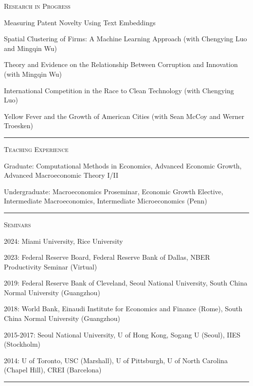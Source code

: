 \documentclass{article}
\begin{document}
\parbox{\textwidth}{
\parbox[t]{0.28\textwidth}{ \raggedright \noindent \textsc{ Research in Progress } }
\parbox[t]{0.72\textwidth}{ \raggedright

Measuring Patent Novelty Using Text Embeddings
\vspace{0.27cm}

Spatial Clustering of Firms: A Machine Learning Approach (with Chengying Luo and Mingqin Wu)
\vspace{0.27cm}

Theory and Evidence on the Relationship Between Corruption and Innovation (with Mingqin Wu)
\vspace{0.27cm}

International Competition in the Race to Clean Technology (with Chengying Luo)
\vspace{0.27cm}

Yellow Fever and the Growth of American Cities (with Sean McCoy and Werner Troesken)
\vspace{0.27cm}

}
\textcolor{light-gray}{\hrule}
}
\vspace{0.3cm}

\parbox{\textwidth}{
\parbox[t]{0.28\textwidth}{ \raggedright \noindent \textsc{ Teaching Experience } }
\parbox[t]{0.72\textwidth}{ \raggedright

Graduate: Computational Methods in Economics, Advanced Economic Growth, Advanced Macroeconomic Theory I/II
\vspace{0.27cm}

Undergraduate: Macroeconomics Proseminar, Economic Growth Elective, Intermediate Macroeconomics, Intermediate Microeconomics (Penn)
\vspace{0.27cm}

}
\textcolor{light-gray}{\hrule}
}
\vspace{0.3cm}

\parbox{\textwidth}{
\parbox[t]{0.28\textwidth}{ \raggedright \noindent \textsc{ Seminars } }
\parbox[t]{0.72\textwidth}{ \raggedright

2024: Miami University, Rice University
\vspace{0.27cm}

2023: Federal Reserve Board, Federal Reserve Bank of Dallas, NBER Productivity Seminar (Virtual)
\vspace{0.27cm}

2019: Federal Reserve Bank of Cleveland, Seoul National University, South China Normal University (Guangzhou)
\vspace{0.27cm}

2018: World Bank, Einaudi Institute for Economics and Finance (Rome), South China Normal University (Guangzhou)
\vspace{0.27cm}

2015-2017: Seoul National University, U of Hong Kong, Sogang U (Seoul), IIES (Stockholm)
\vspace{0.27cm}

2014: U of Toronto, USC (Marshall), U of Pittsburgh, U of North Carolina (Chapel Hill), CREI (Barcelona)
\vspace{0.27cm}

}
\textcolor{light-gray}{\hrule}
}
\vspace{0.3cm}
\end{document}
